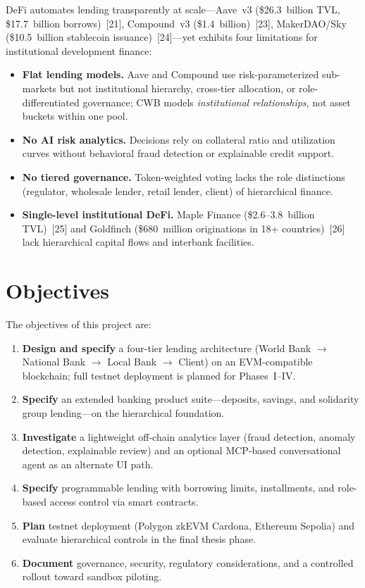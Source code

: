 \documentclass[12pt, a4paper]{report}
\begin{document}
DeFi automates lending transparently at scale---Aave~v3 (\$26.3~billion TVL, \$17.7~billion borrows)~[21], Compound~v3 (\$1.4~billion)~[23], MakerDAO/Sky (\$10.5~billion stablecoin issuance)~[24]---yet exhibits four limitations for institutional development finance:

\begin{itemize}[noitemsep]
\item \textbf{Flat lending models.} Aave and Compound use risk-parameterized sub-markets but not institutional hierarchy, cross-tier allocation, or role-differentiated governance; CWB models \textit{institutional relationships}, not asset buckets within one pool.
\item \textbf{No AI risk analytics.} Decisions rely on collateral ratio and utilization curves without behavioral fraud detection or explainable credit support.
\item \textbf{No tiered governance.} Token-weighted voting lacks the role distinctions (regulator, wholesale lender, retail lender, client) of hierarchical finance.
\item \textbf{Single-level institutional DeFi.} Maple Finance (\$2.6--3.8~billion TVL)~[25] and Goldfinch (\$680~million originations in 18+ countries)~[26] lack hierarchical capital flows and interbank facilities.
\end{itemize}

\section{Objectives}

The objectives of this project are:

\begin{enumerate}[noitemsep]
\item \textbf{Design and specify} a four-tier lending architecture (World Bank $\to$ National Bank $\to$ Local Bank $\to$ Client) on an EVM-compatible blockchain; full testnet deployment is planned for Phases~I--IV.
\item \textbf{Specify} an extended banking product suite---deposits, savings, and solidarity group lending---on the hierarchical foundation.
\item \textbf{Investigate} a lightweight off-chain analytics layer (fraud detection, anomaly detection, explainable review) and an optional MCP-based conversational agent as an alternate UI path.
\item \textbf{Specify} programmable lending with borrowing limits, installments, and role-based access control via smart contracts.
\item \textbf{Plan} testnet deployment (Polygon zkEVM Cardona, Ethereum Sepolia) and evaluate hierarchical controls in the final thesis phase.
\item \textbf{Document} governance, security, regulatory considerations, and a controlled rollout toward sandbox piloting.
\end{enumerate}
\end{document}
